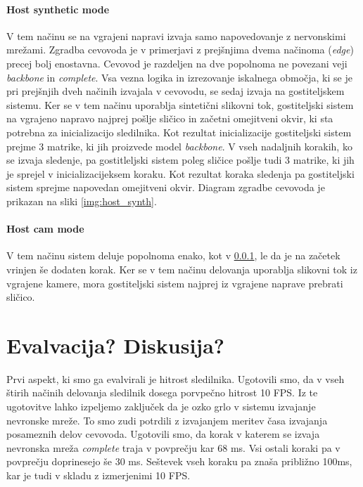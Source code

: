 \documentclass[a4paper,12pt,openright]{book}
\begin{document}
\subsubsection{Host synthetic mode}
\label{sec:host_synth}
V tem načinu se na vgrajeni napravi izvaja samo napovedovanje z nervonskimi mrežami. Zgradba cevovoda je v primerjavi z prejšnjima dvema načinoma (\emph{edge}) precej bolj enostavna. Cevovod je razdeljen na dve popolnoma ne povezani veji \emph{backbone} in \emph{complete}. Vsa vezna logika in izrezovanje iskalnega območja, ki se je pri prejšnjih dveh načinih izvajala v cevovodu, se sedaj izvaja na gostiteljskem sistemu. Ker se v tem načinu uporablja sintetični slikovni tok, gostiteljski sistem na vgrajeno napravo najprej pošlje sličico in začetni omejitveni okvir, ki sta potrebna za inicializacijo sledilnika. Kot rezultat inicializacije gostiteljski sistem prejme 3 matrike, ki jih proizvede model \emph{backbone}. V vseh nadaljnih korakih, ko se izvaja sledenje, pa gostitleljski sistem poleg sličice pošlje tudi 3 matrike, ki jih je sprejel v inicializacijeksem koraku. Kot rezultat koraka sledenja pa gostiteljski sistem sprejme napovedan omejitveni okvir. Diagram zgradbe cevovoda je prikazan na sliki \ref{img:host_synth}.

\subsubsection{Host cam mode}
V tem načinu sistem deluje popolnoma enako, kot v \ref{sec:host_synth}, le da je na začetek vrinjen še dodaten korak. Ker se v tem načinu delovanja uporablja slikovni tok iz vgrajene kamere, mora gostiteljski sistem najprej iz vgrajene naprave prebrati sličico.


\chapter{Evalvacija? Diskusija?}
Prvi aspekt, ki smo ga evalvirali je hitrost sledilnika. Ugotovili smo, da v vseh štirih načinih delovanja sledilnik dosega porvpečno hitrost 10 FPS. Iz te ugotovitve lahko izpeljemo zaključek da je ozko grlo v sistemu izvajanje nevronske mreže. To smo zudi potrdili z izvajanjem meritev časa izvajanja posameznih delov cevovoda. Ugotovili smo, da korak v katerem se izvaja nevronska mreža \emph{complete} traja v povprečju kar 68 ms. Vsi ostali koraki pa v povprečju doprinesejo še 30 ms. Seštevek vseh koraku pa znaša približno 100ms, kar je tudi v skladu z izmerjenimi 10 FPS.
\end{document}
